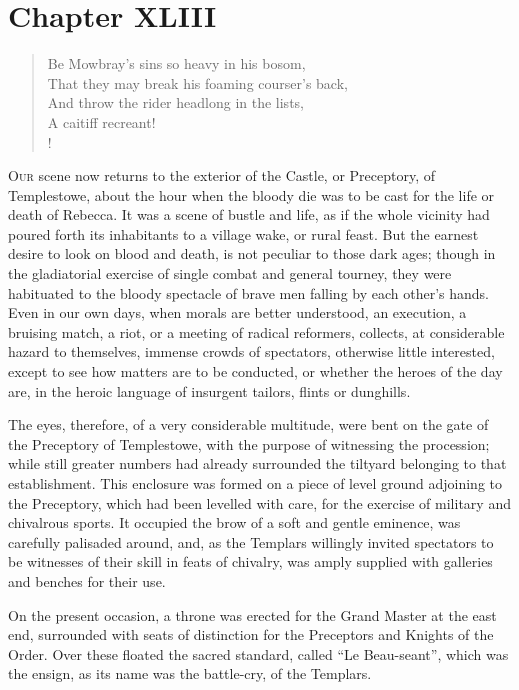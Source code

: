 \chapter{Chapter XLIII}

\begin{verse}
Be Mowbray's sins so heavy in his bosom,\\
That they may break his foaming courser's back,\\
And throw the rider headlong in the lists,\\
A caitiff recreant!\\!
\end{verse}

\lettrine{O}{ur} scene now returns to the exterior of the Castle,
or Preceptory, of
Templestowe, about the hour when the bloody die was to be cast for the
life or death of Rebecca. It was a scene of bustle and life, as if the
whole vicinity had poured forth its inhabitants to a village wake, or
rural feast. But the earnest desire to look on blood and death, is not
peculiar to those dark ages; though in the gladiatorial exercise of
single combat and general tourney, they were habituated to the bloody
spectacle of brave men falling by each other's hands. Even in our own
days, when morals are better understood, an execution, a bruising match,
a riot, or a meeting of radical reformers, collects, at considerable
hazard to themselves, immense crowds of spectators, otherwise little
interested, except to see how matters are to be conducted, or whether
the heroes of the day are, in the heroic language of insurgent tailors,
flints or dunghills.

The eyes, therefore, of a very considerable multitude, were bent on the
gate of the Preceptory of Templestowe, with the purpose of witnessing
the procession; while still greater numbers had already surrounded the
tiltyard belonging to that establishment. This enclosure was formed on a
piece of level ground adjoining to the Preceptory, which had been
levelled with care, for the exercise of military and chivalrous sports.
It occupied the brow of a soft and gentle eminence, was carefully
palisaded around, and, as the Templars willingly invited spectators to
be witnesses of their skill in feats of chivalry, was amply supplied
with galleries and benches for their use.

On the present occasion, a throne was erected for the Grand Master at
the east end, surrounded with seats of distinction for the Preceptors
and Knights of the Order. Over these floated the sacred standard, called
``Le Beau-seant'', which was the ensign, as its name was the battle-cry,
of the Templars.

